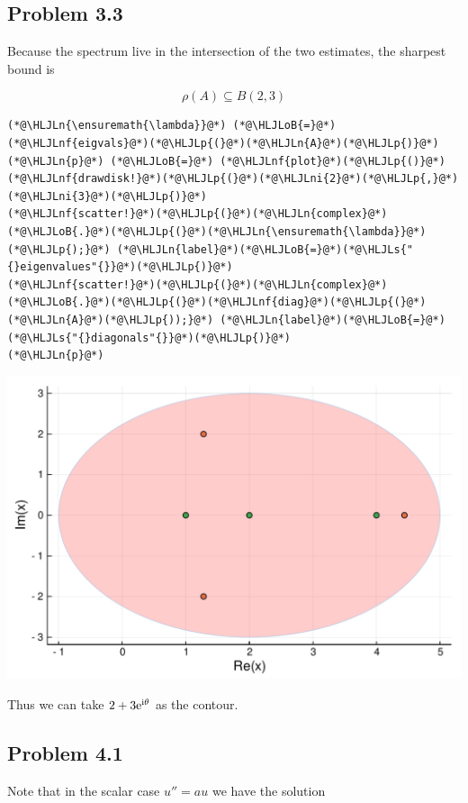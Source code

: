 \documentclass[12pt,a4paper]{article}
\newcommand{\HLJLn}[1]{#1}
\newcommand{\HLJLnf}[1]{\textcolor[RGB]{66,102,213}{#1}}
\newcommand{\HLJLs}[1]{\textcolor[RGB]{201,61,57}{#1}}
\newcommand{\HLJLni}[1]{\textcolor[RGB]{59,151,46}{#1}}
\newcommand{\HLJLoB}[1]{\textcolor[RGB]{102,102,102}{\textbf{#1}}}
\newcommand{\HLJLp}[1]{#1}
\def\I{ {\rm i} }
\def\E{ {\rm e} }
\begin{document}
\subsection{Problem 3.3}
Because the spectrum live in the intersection of the two estimates, the sharpest bound is

\[
\rho(A) \subseteq B(2,3) 
\]

\begin{lstlisting}
(*@\HLJLn{\ensuremath{\lambda}}@*) (*@\HLJLoB{=}@*) (*@\HLJLnf{eigvals}@*)(*@\HLJLp{(}@*)(*@\HLJLn{A}@*)(*@\HLJLp{)}@*)
(*@\HLJLn{p}@*) (*@\HLJLoB{=}@*) (*@\HLJLnf{plot}@*)(*@\HLJLp{()}@*)
(*@\HLJLnf{drawdisk!}@*)(*@\HLJLp{(}@*)(*@\HLJLni{2}@*)(*@\HLJLp{,}@*)(*@\HLJLni{3}@*)(*@\HLJLp{)}@*)
(*@\HLJLnf{scatter!}@*)(*@\HLJLp{(}@*)(*@\HLJLn{complex}@*)(*@\HLJLoB{.}@*)(*@\HLJLp{(}@*)(*@\HLJLn{\ensuremath{\lambda}}@*)(*@\HLJLp{);}@*) (*@\HLJLn{label}@*)(*@\HLJLoB{=}@*)(*@\HLJLs{"{}eigenvalues"{}}@*)(*@\HLJLp{)}@*)
(*@\HLJLnf{scatter!}@*)(*@\HLJLp{(}@*)(*@\HLJLn{complex}@*)(*@\HLJLoB{.}@*)(*@\HLJLp{(}@*)(*@\HLJLnf{diag}@*)(*@\HLJLp{(}@*)(*@\HLJLn{A}@*)(*@\HLJLp{));}@*) (*@\HLJLn{label}@*)(*@\HLJLoB{=}@*)(*@\HLJLs{"{}diagonals"{}}@*)(*@\HLJLp{)}@*)
(*@\HLJLn{p}@*)
\end{lstlisting}

\includegraphics[width=\linewidth]{figures/Solutions1_19_1.pdf}

Thus we can take $2 + 3 \E^{\I \theta}$ as the contour.

\subsection{Problem 4.1}
Note that in the scalar case $u'' = a u$ we have the solution
\end{document}
